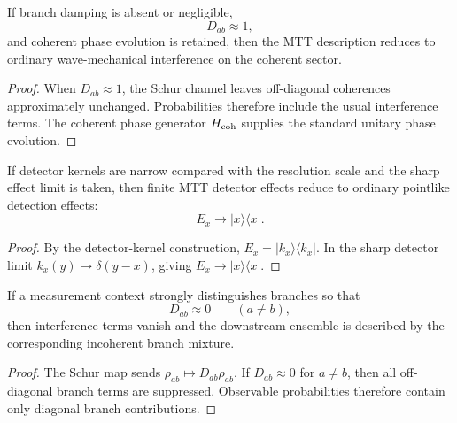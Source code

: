 \documentclass[11pt]{article}
\begin{document}
\begin{corollary}
\label{cor:ordinary-wave-mechanics}
If branch damping is absent or negligible,
\begin{equation}
  D_{ab}\approx1,
\end{equation}
and coherent phase evolution is retained, then the MTT description reduces to ordinary
wave-mechanical interference on the coherent sector.
\end{corollary}

\begin{proof}
When \(D_{ab}\approx1\), the Schur channel leaves off-diagonal coherences approximately
unchanged. Probabilities therefore include the usual interference terms. The coherent
phase generator \(H_{\rm coh}\) supplies the standard unitary phase evolution.
\end{proof}

\begin{corollary}
\label{cor:point-particle-detection}
If detector kernels are narrow compared with the resolution scale and the sharp effect limit
is taken, then finite MTT detector effects reduce to ordinary pointlike detection effects:
\begin{equation}
  E_x\to |x\rangle\langle x|.
\end{equation}
\end{corollary}

\begin{proof}
By the detector-kernel construction, \(E_x=|k_x\rangle\langle k_x|\). In the sharp detector
limit \(k_x(y)\to\delta(y-x)\), giving \(E_x\to |x\rangle\langle x|\).
\end{proof}

\begin{corollary}
\label{cor:incoherent-mixture}
If a measurement context strongly distinguishes branches so that
\begin{equation}
  D_{ab}\approx0
  \qquad
  (a\neq b),
\end{equation}
then interference terms vanish and the downstream ensemble is described by the corresponding
incoherent branch mixture.
\end{corollary}

\begin{proof}
The Schur map sends \(\rho_{ab}\mapsto D_{ab}\rho_{ab}\). If \(D_{ab}\approx0\) for
\(a\neq b\), then all off-diagonal branch terms are suppressed. Observable probabilities
therefore contain only diagonal branch contributions.
\end{proof}
\end{document}
